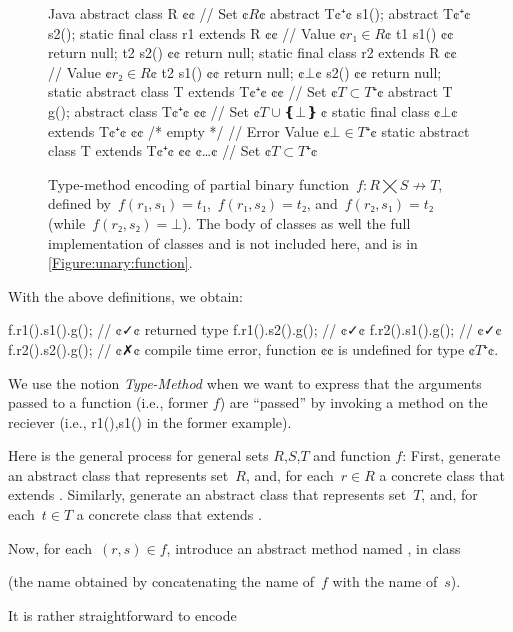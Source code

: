 \begin{figure}
  \begin{Code}{Java}
abstract class R {¢¢ // Set ¢$R$¢
  abstract T¢$⁺$¢ s1();
  abstract T¢$⁺$¢ s2();
  static final class r1 extends R {¢¢ // Value ¢$r₁∈R$¢
    t1 s1() {¢¢ return null; }
    t2 s2() {¢¢ return null; }
  }
  static final class r2 extends R {¢¢ // Value ¢$r₂∈R$¢
    t2 s1() {¢¢ return null; }
    ¢$⊥$¢ s2() {¢¢ return null; }
  }
  static abstract class T extends T¢$⁺$¢ {¢¢ // Set ¢$T⊂T⁺$¢
    abstract T g();
  }
  abstract class T¢$⁺$¢ {¢¢ // Set ¢$T∪❴⊥❵~$¢
    static final class ¢$⊥$¢ extends T¢$⁺$¢ {¢¢ /* empty */ } // Error Value ¢$⊥∈T⁺$¢
    static abstract class T extends T¢$⁺$¢ {¢¢ ¢…¢ } // Set ¢$T⊂T⁺$¢
  }
}
\end{Code}
  \caption{Type-method encoding of partial binary function~$f: R⨉S↛T$,
  defined by~$f(r₁,s₁)=t₁$,~$f(r₁,s₂)=t₂$, and~$f(r₂,s₁)=t₂$ (while~$f(r₂, s₂) =⊥$).
  The body of classes  as well the full implementation of classes  and  is not included here, and is
    in \cref{Figure:unary:function}.}
  \label{Figure:simple:binary}
\end{figure}

With the above definitions, we obtain:
\begin{JAVA}
f.r1().s1().g(); // ¢✓¢ returned type
f.r1().s2().g(); // ¢✓¢
f.r2().s1().g(); // ¢✓¢
f.r2().s2().g(); // ¢✗¢ compile time error, function ¢¢ is undefined for type ¢$T⁺$¢.
\end{JAVA}
We use the notion \emph{Type-Method} when we want to express that the arguments passed to a function 
  (i.e., former $f$) are ``passed'' by invoking a method on the reciever (i.e., r1(),s1() in the former example).

Here is the general process for general sets $R$,$S$,$T$ and function $f$:
First, generate an abstract class  that represents set~$R$, and,
  for each~$r∈R$ a concrete class  that extends .
Similarly, generate an abstract class  that represents set~$T$, and,
  for each~$t∈T$ a concrete class  that extends .

Now, for each~$(r,s)∈f$, introduce an abstract method named ,
  in class~

(the name obtained by
  concatenating the name of~$f$ with the name of~$s$).

It is rather straightforward to encode
